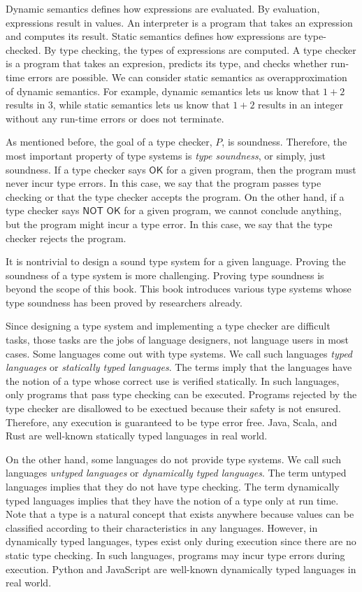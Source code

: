 Dynamic semantics defines how expressions are evaluated. By evaluation,
expressions result in values. An interpreter is a program that takes an
expression and computes its result. Static semantics defines how expressions are
type-checked. By type checking, the types of expressions are computed. A type
checker is a program that takes an expresion, predicts its type, and checks
whether run-time errors are possible. We can consider static semantics as
overapproximation of dynamic semantics. For example, dynamic semantics lets us
know that $1+2$ results in $3$, while static semantics lets us know that $1+2$
results in an integer without any run-time errors or does not terminate.

As mentioned before, the goal of a type checker, $P$, is soundness. Therefore,
the most important property of type systems is \textit{type soundness}, or simply, just soundness. If a type checker says $\textsf{OK}$ for
a given program, then the program must never incur type errors. In this
case, we say that the program passes type checking or that the type checker accepts
the program. On the other hand, if a type checker says $\textsf{NOT OK}$ for a
given program, we cannot conclude anything, but the program might incur a type
error. In this case, we say that the type checker rejects the program.

It is nontrivial to design a sound type system for a given language. Proving the
soundness of a type system is more challenging. Proving type soundness is
beyond the scope of this book. This book introduces various type systems whose
type soundness has been proved by researchers already.

Since designing a type system and implementing a type checker are
difficult tasks, those tasks are the jobs of language designers, not language
users in most cases. Some languages come out with type systems. We call such languages
\textit{typed languages} or \textit{statically typed
languages}. The terms imply that the languages
have the notion of a type whose correct use is verified statically.
In such languages, only programs
that pass type checking can be executed. Programs rejected by the type checker
are disallowed to be exectued because their safety is not ensured. Therefore,
any execution is guaranteed to be type error free. Java, Scala,
and Rust are well-known statically typed languages in real world.

On the other hand, some languages do not provide type systems. We call such
languages \textit{untyped languages} or
\textit{dynamically typed languages}.
The term untyped languages implies that they do not have type checking.
The term dynamically typed languages implies that they have the notion of a type
only at run time. Note that a type is a natural concept that exists anywhere
because values can be classified according to their characteristics in any
languages. However, in dynamically typed languages, types exist only during execution since there are no static
type checking. In such languages, programs may incur type errors during execution.
Python and JavaScript are well-known dynamically typed languages in real world.

